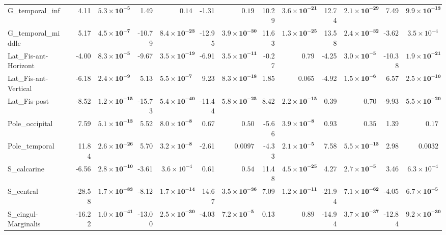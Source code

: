 {\begin{longtable}{llrrrrrrrrrrrr}
G\_temporal\_inf &  & 4.11 & $\mathbf{5.3{\times}10^{-5}}$ & 1.49 & $0.14$ & -1.31 & $0.19$ & 10.29 & $\mathbf{3.6{\times}10^{-21}}$ & 12.74 & $\mathbf{2.1{\times}10^{-29}}$ & 7.49 & $\mathbf{9.9{\times}10^{-13}}$ \\
G\_temporal\_middle &  & 5.17 & $\mathbf{4.5{\times}10^{-7}}$ & -10.79 & $\mathbf{8.4{\times}10^{-23}}$ & -12.95 & $\mathbf{3.9{\times}10^{-30}}$ & 11.63 & $\mathbf{1.3{\times}10^{-25}}$ & 13.58 & $\mathbf{2.4{\times}10^{-32}}$ & -3.62 & $3.5{\times}10^{-4}$ \\
Lat\_Fis-ant-Horizont &  & -4.00 & $\mathbf{8.3{\times}10^{-5}}$ & -9.67 & $\mathbf{3.5{\times}10^{-19}}$ & -6.91 & $\mathbf{3.5{\times}10^{-11}}$ & -0.27 & $0.79$ & -4.25 & $\mathbf{3.0{\times}10^{-5}}$ & -10.38 & $\mathbf{1.9{\times}10^{-21}}$ \\
Lat\_Fis-ant-Vertical &  & -6.18 & $\mathbf{2.4{\times}10^{-9}}$ & 5.13 & $\mathbf{5.5{\times}10^{-7}}$ & 9.23 & $\mathbf{8.3{\times}10^{-18}}$ & 1.85 & $0.065$ & -4.92 & $\mathbf{1.5{\times}10^{-6}}$ & 6.57 & $\mathbf{2.5{\times}10^{-10}}$ \\
Lat\_Fis-post &  & -8.52 & $\mathbf{1.2{\times}10^{-15}}$ & -15.73 & $\mathbf{5.4{\times}10^{-40}}$ & -11.44 & $\mathbf{5.8{\times}10^{-25}}$ & 8.42 & $\mathbf{2.2{\times}10^{-15}}$ & 0.39 & $0.70$ & -9.93 & $\mathbf{5.5{\times}10^{-20}}$ \\
Pole\_occipital &  & 7.59 & $\mathbf{5.1{\times}10^{-13}}$ & 5.52 & $\mathbf{8.0{\times}10^{-8}}$ & 0.67 & $0.50$ & -5.66 & $\mathbf{3.9{\times}10^{-8}}$ & 0.93 & $0.35$ & 1.39 & $0.17$ \\
Pole\_temporal &  & 11.84 & $\mathbf{2.6{\times}10^{-26}}$ & 5.70 & $\mathbf{3.2{\times}10^{-8}}$ & -2.61 & $0.0097$ & -4.33 & $\mathbf{2.1{\times}10^{-5}}$ & 7.58 & $\mathbf{5.5{\times}10^{-13}}$ & 2.98 & $0.0032$ \\
S\_calcarine &  & -6.56 & $\mathbf{2.8{\times}10^{-10}}$ & -3.61 & $3.6{\times}10^{-4}$ & 0.61 & $0.54$ & 11.48 & $\mathbf{4.5{\times}10^{-25}}$ & 4.27 & $\mathbf{2.7{\times}10^{-5}}$ & 3.46 & $6.3{\times}10^{-4}$ \\
S\_central &  & -28.58 & $\mathbf{1.7{\times}10^{-83}}$ & -8.12 & $\mathbf{1.7{\times}10^{-14}}$ & 14.67 & $\mathbf{3.5{\times}10^{-36}}$ & 7.09 & $\mathbf{1.2{\times}10^{-11}}$ & -21.94 & $\mathbf{7.1{\times}10^{-62}}$ & -4.05 & $\mathbf{6.7{\times}10^{-5}}$ \\
S\_cingul-Marginalis &  & -16.22 & $\mathbf{1.0{\times}10^{-41}}$ & -13.00 & $\mathbf{2.5{\times}10^{-30}}$ & -4.03 & $\mathbf{7.2{\times}10^{-5}}$ & 0.13 & $0.89$ & -14.94 & $\mathbf{3.7{\times}10^{-37}}$ & -12.84 & $\mathbf{9.2{\times}10^{-30}}$ \\

\end{longtable}}
